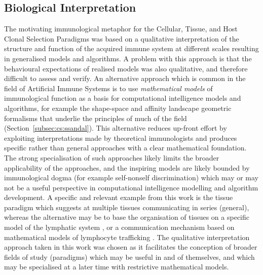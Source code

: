 %
%
\subsection{Biological Interpretation}
The motivating immunological metaphor for the Cellular, Tissue, and Host Clonal Selection Paradigms was based on a qualitative interpretation of the structure and function of the acquired immune system at different scales resulting in generalised models and algorithms. A problem with this approach is that the behavioural expectations of realised models was also qualitative, and therefore difficult to assess and verify.
An alternative approach which is common in the field of Artificial Immune Systems is to use \emph{mathematical models} of immunological function as a basis for computational intelligence models and algorithms, for example the shape-space and affinity landscape geometric formalisms that underlie the principles of much of the field (Section~\ref{subsec:cs:ssandal}). 
This alternative reduces up-front effort by exploiting interpretations made by theoretical immunologists and produces specific rather than general approaches with a clear mathematical foundation. The strong specialisation of such approaches likely limits the broader applicability of the approaches, and the inspiring models are likely bounded by immunological dogma (for example self-nonself discrimination) which may or may not be a useful perspective in computational intelligence modelling and algorithm development. 
A specific and relevant example from this work is the tissue paradigm which suggests at multiple tissues communicating in series (general), whereas the alternative may be to base the organisation of tissues on a specific model of the lymphatic system \cite{Anderson1990a}, or a communication mechanism based on mathematical models of lymphocyte trafficking \cite{Stekel1997, Stekel1998, Srikusalanukul2000}.
The qualitative interpretation approach taken in this work was chosen as it facilitates the conception of broader fields of study (paradigms) which may be useful in and of themselves, and which may be specialised at a later time with restrictive mathematical models.

%
%
